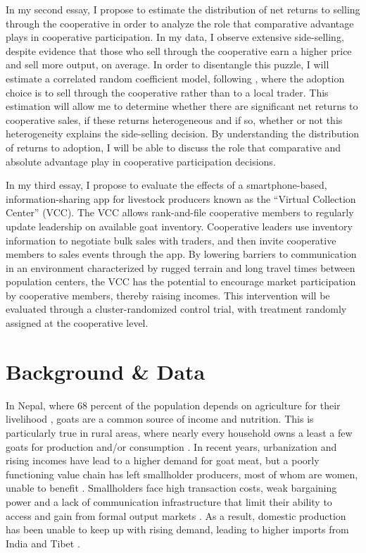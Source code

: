 \documentclass[11pt]{article}
\begin{document}
In my second essay, I propose to estimate the distribution of net returns to selling through the cooperative in order to analyze the role that comparative advantage plays in cooperative participation. In my data, I observe extensive side-selling, despite evidence that those who sell through the cooperative earn a higher price and sell more output, on average. In order to disentangle this puzzle, I will estimate a correlated random coefficient model, following \citet{suri11}, where the adoption choice is to sell through the cooperative rather than to a local trader. This estimation will allow me to determine whether there are significant net returns to cooperative sales, if these returns heterogeneous and if so, whether or not this heterogeneity explains the side-selling decision. By understanding the distribution of returns to adoption, I will be able to discuss the role that comparative and absolute advantage play in cooperative participation decisions. 

In my third essay, I propose to evaluate the effects of a smartphone-based, information-sharing app for livestock producers known as the ``Virtual Collection Center'' (VCC). The VCC allows rank-and-file cooperative members to regularly update leadership on available goat inventory. Cooperative leaders use inventory information to negotiate bulk sales with traders, and then invite cooperative members to sales events through the app. By lowering barriers to communication in an environment characterized by rugged terrain and long travel times between population centers, the VCC has the potential to encourage market participation by cooperative members, thereby raising incomes. This intervention will be evaluated through a cluster-randomized control trial, with treatment randomly assigned at the cooperative level. 

\newpage
\section{Background \& Data} \label{sec:background}

In Nepal, where 68 percent of the population depends on agriculture for their livelihood \citep{ILO16}, goats are a common source of income and nutrition. This is particularly true in rural areas, where nearly every household owns a least a few goats for production and/or consumption \citep{upreti09}. In recent years, urbanization and rising incomes have lead to a higher demand for goat meat, but a poorly functioning value chain has left smallholder producers, most of whom are women, unable to benefit \citep{ashby-et.al.09,choudhary-et.al.11,gurung-et.al.15}. Smallholders face high transaction costs, weak bargaining power and a lack of communication infrastructure that limit their ability to access and gain from formal output markets \citep{ashby-et.al.09,kristjanson-et.al.14}. As a result, domestic production has been unable to keep up with rising demand, leading to higher imports from India and Tibet \citep{HI-N12}.
\end{document}

